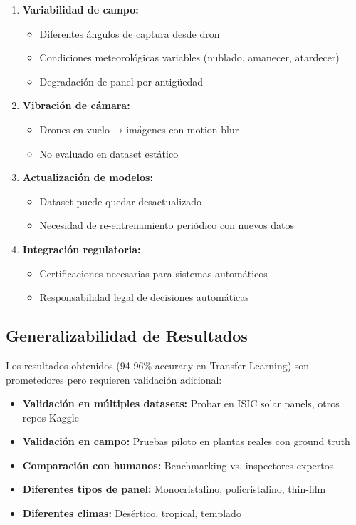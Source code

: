 \documentclass[11pt, a4paper]{article}
\begin{document}
\begin{enumerate}
    \item \textbf{Variabilidad de campo:}
    \begin{itemize}
        \item Diferentes ángulos de captura desde dron
        \item Condiciones meteorológicas variables (nublado, amanecer, atardecer)
        \item Degradación de panel por antigüedad
    \end{itemize}
    
    \item \textbf{Vibración de cámara:}
    \begin{itemize}
        \item Drones en vuelo → imágenes con motion blur
        \item No evaluado en dataset estático
    \end{itemize}
    
    \item \textbf{Actualización de modelos:}
    \begin{itemize}
        \item Dataset puede quedar desactualizado
        \item Necesidad de re-entrenamiento periódico con nuevos datos
    \end{itemize}
    
    \item \textbf{Integración regulatoria:}
    \begin{itemize}
        \item Certificaciones necesarias para sistemas automáticos
        \item Responsabilidad legal de decisiones automáticas
    \end{itemize}
\end{enumerate}

\subsection{Generalizabilidad de Resultados}

Los resultados obtenidos (94-96\% accuracy en Transfer Learning) son prometedores pero requieren validación adicional:

\begin{itemize}
    \item \textbf{Validación en múltiples datasets:} Probar en ISIC solar panels, otros repos Kaggle
    \item \textbf{Validación en campo:} Pruebas piloto en plantas reales con ground truth
    \item \textbf{Comparación con humanos:} Benchmarking vs. inspectores expertos
    \item \textbf{Diferentes tipos de panel:} Monocristalino, policristalino, thin-film
    \item \textbf{Diferentes climas:} Desértico, tropical, templado
\end{itemize}
\end{document}
